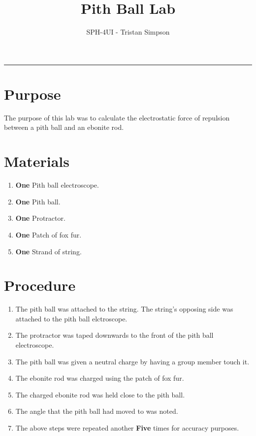 \documentclass{article}
\title{Pith Ball Lab}
\author{SPH-4UI - Tristan Simpson}
\begin{document}
\maketitle

\vspace{0.5cm}
\hrule
\vspace{0.5cm}
\section*{Purpose}
The purpose of this lab was to calculate the electrostatic force of repulsion between a pith ball and an ebonite rod.

\section*{Materials}
\begin{enumerate}
    \item {\textbf{One} Pith ball electroscope.}
    \item {\textbf{One} Pith ball.}
    \item {\textbf{One} Protractor.}
    \item {\textbf{One} Patch of fox fur.}
    \item {\textbf{One} Strand of string.}
\end{enumerate}

\section*{Procedure}
\begin{enumerate}
    \item {The pith ball was attached to the string. The string's opposing side was attached to the pith ball elctroscope.}
    \item {The protractor was taped downwards to the front of the pith ball electroscope.}
    \item {The pith ball was given a neutral charge by having a group member touch it.}
    \item {The ebonite rod was charged using the patch of fox fur.}
    \item {The charged ebonite rod was held close to the pith ball.}
    \item {The angle that the pith ball had moved to was noted.}
    \item {The above steps were repeated another \textbf{Five} times for accuracy purposes.}
\end{enumerate}\leavevmode
\end{document}
